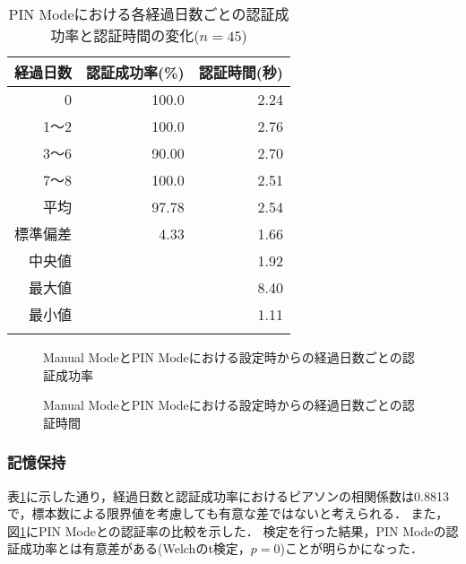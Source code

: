 \begin{table}[b]
  \caption{PIN Modeにおける各経過日数ごとの認証成功率と認証時間の変化($ n = 45 $)}
  \label{tab:manual.data}
  \begin{center}
    \small
    \begin{tabular}{rrr}
      \bhline
      経過日数 & 認証成功率(\%) & 認証時間(秒)\\ \hline
      0 & 100.0 & 2.24 \\
      1〜2 & 100.0 & 2.76 \\
      3〜6 & 90.00 & 2.70 \\
      7〜8 & 100.0 & 2.51 \\ \hline \hline
      平均 & 97.78 & 2.54 \\
      標準偏差 & 4.33 & 1.66 \\
      中央値 & & 1.92 \\
      最大値 & & 8.40 \\
      最小値 & & 1.11 \\
      \bhline
    \end{tabular}
  \end{center}
\end{table}

\begin{figure}[t]
  \begin{center}
  \end{center}
  \caption{Manual ModeとPIN Modeにおける設定時からの経過日数ごとの認証成功率}
  \label{fig:ex_manual_vs_pin_rate}
\end{figure}

\begin{figure}[b]
  \begin{center}
  \end{center}
  \caption{Manual ModeとPIN Modeにおける設定時からの経過日数ごとの認証時間}
  \label{fig:ex_manual_vs_pin_time}
\end{figure}

\subsubsection{記憶保持}
表\ref{tab:manual.data}に示した通り，経過日数と認証成功率におけるピアソンの相関係数は0.8813で，標本数による限界値\cite{978-4641121607}を考慮しても有意な差ではないと考えられる．
また，図\ref{fig:ex_manual_vs_pin_rate}にPIN Modeとの認証率の比較を示した．
検定を行った結果，PIN Modeの認証成功率とは有意差がある(Welchのt検定，$ p = 0 $)ことが明らかになった．

